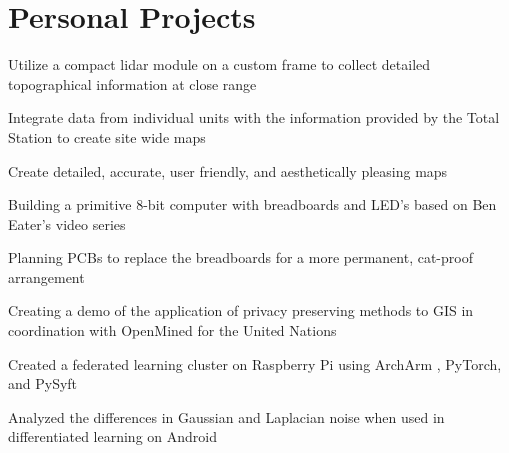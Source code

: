 \documentclass[letterpaper]{resume}
\begin{document}
\section{Personal Projects}

\begin{compactitem}
\item Utilize a compact lidar module on a custom frame to collect detailed topographical information at close range
\item Integrate data from individual units with the information provided by the Total Station to create site wide maps
\item Create detailed, accurate, user friendly, and aesthetically pleasing maps
\end{compactitem}

\begin{compactitem}
\item Building a primitive 8-bit computer with breadboards and LED's based on Ben Eater's video series
\item Planning PCBs to replace the breadboards for a more permanent, cat-proof arrangement
\end{compactitem}

\begin{compactitem}
\item Creating a demo of the application of privacy preserving methods to GIS in coordination with OpenMined for the United Nations
\item Created a federated learning cluster on Raspberry Pi using ArchArm , PyTorch, and PySyft
\item Analyzed the differences in Gaussian and Laplacian noise when used in differentiated learning on Android%
\end{compactitem}
\end{document}

